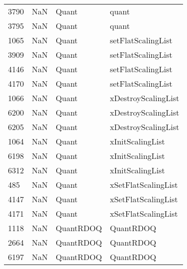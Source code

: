 \begin{tabular}{llll}
3790 &                   NaN &                      Quant &                                     quant \\
3795 &                   NaN &                      Quant &                                     quant \\
1065 &                   NaN &                      Quant &                        setFlatScalingList \\
3909 &                   NaN &                      Quant &                        setFlatScalingList \\
4146 &                   NaN &                      Quant &                        setFlatScalingList \\
4170 &                   NaN &                      Quant &                        setFlatScalingList \\
1066 &                   NaN &                      Quant &                       xDestroyScalingList \\
6200 &                   NaN &                      Quant &                       xDestroyScalingList \\
6205 &                   NaN &                      Quant &                       xDestroyScalingList \\
1064 &                   NaN &                      Quant &                          xInitScalingList \\
6198 &                   NaN &                      Quant &                          xInitScalingList \\
6312 &                   NaN &                      Quant &                          xInitScalingList \\
485  &                   NaN &                      Quant &                       xSetFlatScalingList \\
4147 &                   NaN &                      Quant &                       xSetFlatScalingList \\
4171 &                   NaN &                      Quant &                       xSetFlatScalingList \\
1118 &                   NaN &                  QuantRDOQ &                                 QuantRDOQ \\
2664 &                   NaN &                  QuantRDOQ &                                 QuantRDOQ \\
6197 &                   NaN &                  QuantRDOQ &                                 QuantRDOQ \\

\end{tabular}
